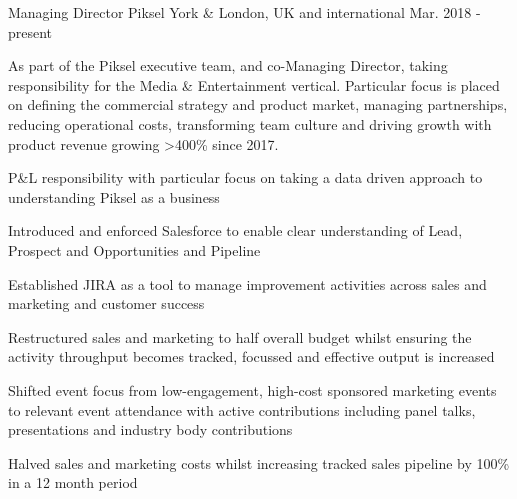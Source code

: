 


\begin{cventries}


\cvexpentry
{Managing Director} %
{Piksel} %
{York \& London, UK and international} %
{Mar. 2018 - present} %
{
\begin{cvitemstitle}
\item {As part of the Piksel executive team, and co-Managing Director, taking responsibility for the Media \& Entertainment vertical. Particular focus is placed on defining the commercial strategy and product market, managing partnerships, reducing operational costs, transforming team culture and driving growth with product revenue growing >400\% since 2017.}
\end{cvitemstitle}
}
{ %
\begin{cvitems}
\item {P\&L responsibility with particular focus on taking a data driven approach to understanding Piksel as a business}
\item {Introduced and enforced Salesforce to enable clear understanding of Lead, Prospect and Opportunities and Pipeline}
\item {Established JIRA as a tool to manage improvement activities across sales and marketing and customer success}
\item {Restructured sales and marketing to half overall budget whilst ensuring the activity throughput becomes tracked, focussed and effective output is increased}
\item {Shifted event focus from low-engagement, high-cost sponsored marketing events to relevant event attendance with active contributions including panel talks, presentations and industry body contributions}
\item {Halved sales and marketing costs whilst increasing tracked sales pipeline by 100\% in a 12 month period}
\end{cvitems}
}


\end{cventries}
